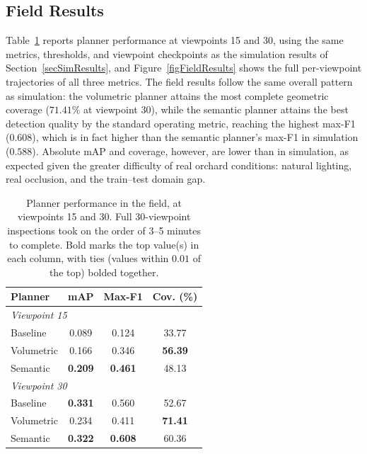 \subsection{Field Results} \label{secFieldResults}

Table~\ref{tabFieldResults} reports planner performance at viewpoints 15 and
30, using the same metrics, thresholds, and viewpoint checkpoints as the
simulation results of Section~\ref{secSimResults}, and
Figure~\ref{figFieldResults} shows the full per-viewpoint trajectories of
all three metrics. The field results follow the same overall pattern as
simulation: the volumetric planner attains the most complete geometric
coverage ($71.41\%$ at viewpoint $30$), while the semantic planner attains
the best detection quality by the standard operating metric, reaching the
highest max-F1 ($0.608$), which is in fact higher than the semantic
planner's max-F1 in simulation ($0.588$). Absolute mAP and coverage,
however, are lower than in simulation, as expected given the greater
difficulty of real orchard conditions: natural lighting, real occlusion,
and the train--test domain gap.

\begin{table}[h]
\centering
\caption{Planner performance in the field, at viewpoints 15 and 30. Full
         30-viewpoint inspections took on the order of 3--5 minutes to
         complete. Bold marks the top value(s) in each column, with ties
         (values within $0.01$ of the top) bolded together.}
\label{tabFieldResults}
\small
\setlength{\tabcolsep}{4pt}
\begin{tabular}{l ccc}
\toprule
Planner & mAP & Max-F1 & Cov. (\%) \\
\midrule
\multicolumn{4}{l}{\textit{Viewpoint 15}} \\
Baseline   & 0.089 & 0.124 & 33.77 \\
Volumetric & 0.166 & 0.346 & \textbf{56.39} \\
Semantic   & \textbf{0.209} & \textbf{0.461} & 48.13 \\
\midrule
\multicolumn{4}{l}{\textit{Viewpoint 30}} \\
Baseline   & \textbf{0.331} & 0.560 & 52.67 \\
Volumetric & 0.234 & 0.411 & \textbf{71.41} \\
Semantic   & \textbf{0.322} & \textbf{0.608} & 60.36 \\
\bottomrule
\end{tabular}
\end{table}

